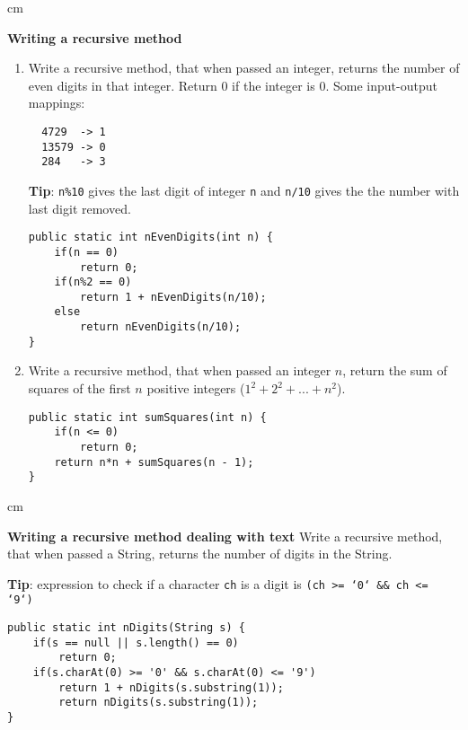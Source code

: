 \begin{questions}
 cm

\question  \textbf{Writing a recursive method} \vskip 0.5cm

\begin{enumerate}
  \item Write a recursive method, that when passed an integer, returns the number of even digits in that integer. Return 0 if the integer is 0. Some input-output mappings:
\begin{verbatim}
  4729  -> 1
  13579 -> 0
  284   -> 3	
\end{verbatim}

\textbf{Tip}: \texttt{n\%10} gives the last digit of integer \texttt{n} and  \texttt{n/10} gives the the number with last digit removed.

\begin{solution}
\begin{lstlisting}
public static int nEvenDigits(int n) {
	if(n == 0)
		return 0;
	if(n%2 == 0)
		return 1 + nEvenDigits(n/10);
	else
		return nEvenDigits(n/10);
}
\end{lstlisting}	
\end{solution}

\item Write a recursive method, that when passed an integer $n$, return the sum of squares of the first $n$ positive integers  ($1^2 + 2^2 + ... + n^2$).

\begin{solution}
\begin{lstlisting}
public static int sumSquares(int n) {
	if(n <= 0)
		return 0;
	return n*n + sumSquares(n - 1);
}
\end{lstlisting}	
\end{solution}
\end{enumerate}
 cm

\question  \textbf{Writing a recursive method dealing with text} \vskip 0.5cm
Write a recursive method, that when passed a String, returns the number of digits in the String.

\textbf{Tip}: expression to check if a character \texttt{ch} is a digit is \texttt{(ch >= `0` \&\& ch <= `9`)}

\begin{solution}
\begin{lstlisting}
public static int nDigits(String s) {
	if(s == null || s.length() == 0)
		return 0;
	if(s.charAt(0) >= '0' && s.charAt(0) <= '9')
		return 1 + nDigits(s.substring(1));
		return nDigits(s.substring(1));	
}
\end{lstlisting}	
\end{solution}


\end{questions}
